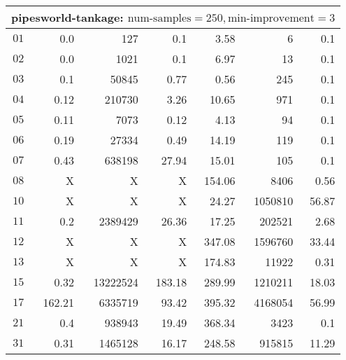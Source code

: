 \begin{longtable}{|c||r|r|r||r|r|r|}
\multicolumn{7}{|l|}{pipesworld-tankage: $\text{num-samples}=250,\text{min-improvement}=3$}\\\hline
$01$ & 0.0 & 127 & 0.1 &3.58 & 6 & 0.1 \\\hline
$02$ & 0.0 & 1021 & 0.1 &6.97 & 13 & 0.1 \\\hline
$03$ & 0.1 & 50845 & 0.77 &0.56 & 245 & 0.1 \\\hline
$04$ & 0.12 & 210730 & 3.26 &10.65 & 971 & 0.1 \\\hline
$05$ & 0.11 & 7073 & 0.12 &4.13 & 94 & 0.1 \\\hline
$06$ & 0.19 & 27334 & 0.49 &14.19 & 119 & 0.1 \\\hline
$07$ & 0.43 & 638198 & 27.94 &15.01 & 105 & 0.1 \\\hline
$08$ & X & X & X &154.06 & 8406 & 0.56 \\\hline
$10$ & X & X & X &24.27 & 1050810 & 56.87 \\\hline
$11$ & 0.2 & 2389429 & 26.36 &17.25 & 202521 & 2.68 \\\hline
$12$ & X & X & X &347.08 & 1596760 & 33.44 \\\hline
$13$ & X & X & X &174.83 & 11922 & 0.31 \\\hline
$15$ & 0.32 & 13222524 & 183.18 &289.99 & 1210211 & 18.03 \\\hline
$17$ & 162.21 & 6335719 & 93.42 &395.32 & 4168054 & 56.99 \\\hline
$21$ & 0.4 & 938943 & 19.49 &368.34 & 3423 & 0.1 \\\hline
$31$ & 0.31 & 1465128 & 16.17 &248.58 & 915815 & 11.29 \\\hline


\end{longtable}
